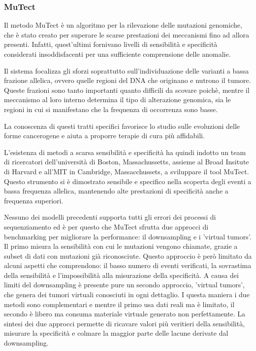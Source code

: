 \subsubsection{MuTect}
Il metodo MuTect è un algoritmo per la rilevazione delle mutazioni genomiche, che è stato creato per superare le scarse prestazioni dei meccanismi fino ad allora presenti.
Infatti, quest'ultimi fornivano livelli di sensibilità e specificità considerati insoddisfacenti per una sufficiente comprensione delle anomalie.

Il sistema focalizza gli sforzi soprattutto sull'individuazione delle varianti a bassa frazione allelica, ovvero quelle regioni del DNA che originano e nutrono il tumore.
Queste frazioni sono tanto importanti quanto difficili da scovare poichè, mentre il meccanismo al loro interno determina il tipo di alterazione genomica, sia le regioni in cui si manifestano che la frequenza di occorrenza sono basse.

La conoscenza di questi tratti specifici favorisce lo studio sulle evoluzioni delle forme cancerogene e aiuta a proporre terapie di cura più affidabili.

L'esistenza di metodi a scarsa sensibilità e specificità ha quindi indotto un team di ricercatori dell'università di Boston, Massachussetts, assieme al Broad Insitute di Harvard e all'MIT in Cambridge, Massacchussets, a sviluppare il tool MuTect.
Questo strumento si è dimostrato sensibile e specifico nella scoperta degli eventi a bassa frequenza allelica, mantenendo alte prestazioni di specificità anche a frequenza superiori.

Nessuno dei modelli precedenti supporta tutti gli errori dei processi di sequenziamento ed è per questo che MuTect sfrutta due approcci di benchmarking per migliorare la performance: il downsampling e  i 'virtual tumors'.
Il primo misura la sensibilità con cui le mutazioni vengono chiamate, grazie a subset di dati con mutazioni già riconosciute.
Questo approccio è però limitato da alcuni aspetti che comprendono: il basso numero di eventi verificati, la sovrastima della sensibilità e l'impossibilità alla misurazione della specificità.
A causa dei limiti del downsampling è presente pure un secondo approccio, 'virtual tumors', che genera dei tumori virtuali conosciuti in ogni dettaglio.
I questa maniera i due metodi sono complementari e mentre il primo usa dati reali ma è limitato, il secondo è libero ma consuma materiale virtuale generato non perfettamente.
La sintesi dei due approcci permette di ricavare valori più veritieri della  sensibilità, misurare la specificità e colmare la maggior parte delle lacune derivate dal downsampling.

